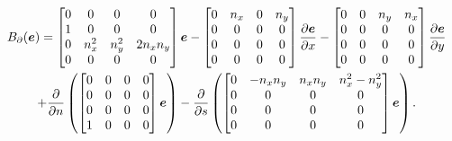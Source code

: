\documentclass[preprint,12pt]{elsarticle}
\begin{document}
	\begin{multline}
		B_{\partial}(\bm{e}) = 
		\begin{bmatrix}
		0 & 0 & 0 & 0 \\
		1 & 0 & 0 & 0 \\
		0 & n_x^2 & n_y^2 & 2 n_x n_y \\
		0 & 0 & 0 & 0 \\
		\end{bmatrix}\bm{e}  - 
		\begin{bmatrix}
		0 & n_x  & 0 & n_y  \\
		0 & 0 & 0 & 0 \\
		0 & 0 & 0 & 0 \\
		0 & 0 & 0 & 0 \\
		\end{bmatrix}\diffp{\bm{e}}{x} -
		\begin{bmatrix}
		0 & 0 & n_y & n_x  \\
		0 & 0 & 0 & 0 \\
		0 & 0 & 0 & 0 \\
		0 & 0 & 0 & 0 \\
		\end{bmatrix}\diffp{\bm{e}}{y} \\
		+ \diffp{}{n}\left(
		\begin{bmatrix}
		0 & 0 & 0 & 0 \\
		0 & 0 & 0 & 0 \\
		0 & 0 & 0 & 0 \\
		1 & 0 & 0 & 0 \\
		\end{bmatrix} \bm{e} \right) - \diffp{}{s}\left(
		\begin{bmatrix}
		0 & - n_x n_y & n_x n_y & n_x^2-n_y^2 \\
		0 & 0 & 0 & 0 \\
		0 & 0 & 0 & 0 \\
		0 & 0 & 0 & 0 \\
		\end{bmatrix} \bm{e} \right).
	\end{multline}
	
\end{document}
